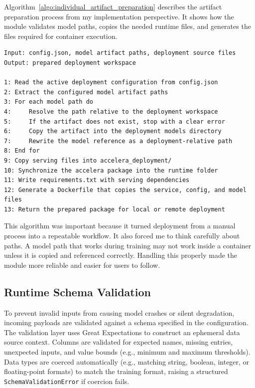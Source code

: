 \documentclass[12pt,a4paper,oneside]{report}
\begin{document}
Algorithm~\ref{algo:individual_artifact_preparation} describes the artifact preparation process from my implementation perspective. It shows how the module validates model paths, copies the needed runtime files, and generates the files required for container execution.

\begin{lstlisting}[style=algostyle,caption={Deployment Artifact Preparation},label={algo:individual_artifact_preparation}]
Input: config.json, model artifact paths, deployment source files
Output: prepared deployment workspace

1: Read the active deployment configuration from config.json
2: Extract the configured model artifact paths
3: For each model path do
4:     Resolve the path relative to the deployment workspace
5:     If the artifact does not exist, stop with a clear error
6:     Copy the artifact into the deployment models directory
7:     Rewrite the model reference as a deployment-relative path
8: End for
9: Copy serving files into accelera_deployment/
10: Synchronize the accelera package into the runtime folder
11: Write requirements.txt with serving dependencies
12: Generate a Dockerfile that copies the service, config, and model files
13: Return the prepared package for local or remote deployment
\end{lstlisting}

This algorithm was important because it turned deployment from a manual process into a repeatable workflow. It also forced me to think carefully about paths. A model path that works during training may not work inside a container unless it is copied and referenced correctly. Handling this properly made the module more reliable and easier for users to follow.

\subsection{Runtime Schema Validation}
\noindent To prevent invalid inputs from causing model crashes or silent degradation, incoming payloads are validated against a schema specified in the configuration. The validation layer uses Great Expectations to construct an ephemeral data source context. Columns are validated for expected names, missing entries, unexpected inputs, and value bounds (e.g., minimum and maximum thresholds). Data types are coerced automatically (e.g., matching string, boolean, integer, or floating-point formats) to match the training format, raising a structured \texttt{SchemaValidationError} if coercion fails.
\end{document}
